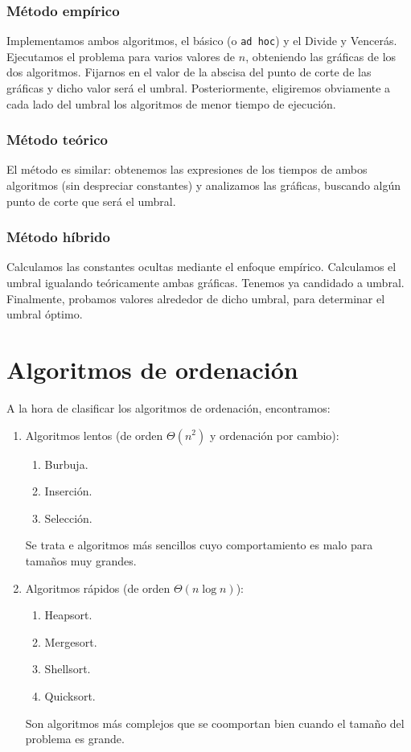 \subsubsection{Método empírico}
Implementamos ambos algoritmos, el básico (o \verb|ad hoc|) y el Divide y Vencerás. Ejecutamos el problema para varios valores de $n$, obteniendo las gráficas de los dos algoritmos. Fijarnos en el valor de la abscisa del punto de corte de las gráficas y dicho valor será el umbral. Posteriormente, eligiremos obviamente a cada lado del umbral los algoritmos de menor tiempo de ejecución.

\subsubsection{Método teórico}
El método es similar: obtenemos las expresiones de los tiempos de ambos algoritmos (sin despreciar constantes) y analizamos las gráficas, buscando algún punto de corte que será el umbral.

\subsubsection{Método híbrido}
Calculamos las constantes ocultas mediante el enfoque empírico. Calculamos el umbral igualando teóricamente ambas gráficas. Tenemos ya candidado a umbral. Finalmente, probamos valores alrededor de dicho umbral, para determinar el umbral óptimo.

\section{Algoritmos de ordenación}
A la hora de clasificar los algoritmos de ordenación, encontramos:
\begin{enumerate}
    \item Algoritmos lentos (de orden $\Theta(n^2)$ y ordenación por cambio):
        \begin{enumerate}
            \item Burbuja.
            \item Inserción.
            \item Selección.
        \end{enumerate}
        Se trata e algoritmos más sencillos cuyo comportamiento es malo para tamaños muy grandes.
    \item Algoritmos rápidos (de orden $\Theta(n\log n)$):
        \begin{enumerate}
            \item Heapsort.
            \item Mergesort.
            \item Shellsort.
            \item Quicksort.
        \end{enumerate}
        Son algoritmos más complejos que se coomportan bien cuando el tamaño del problema es grande.
\end{enumerate}

